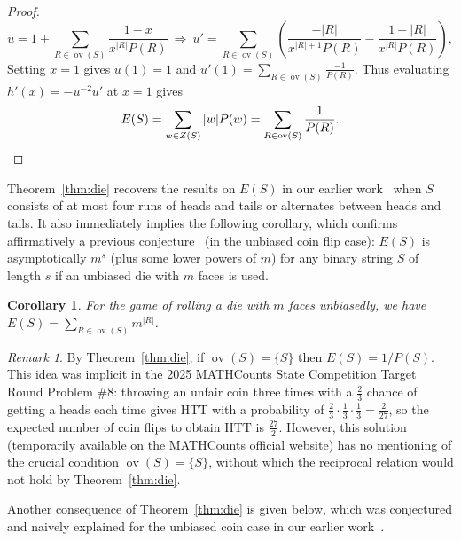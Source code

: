 \documentclass[10pt]{amsart}
\newtheorem{corollary}[theorem]{Corollary}
\theoremstyle{definition}
\theoremstyle{remark}
\newtheorem{remark}[theorem]{Remark}
\newcommand{\HH}{\mathrm{H}} \newcommand{\TT}{\mathrm{T}}
\DeclareMathOperator{\overlap}{ov}
\begin{document}
\begin{proof}
\[ u = 1 + \sum_{R\in\overlap(S)} \frac{1-x}{x^{|R|} P(R)} \ \Longrightarrow \ 
u' = \sum_{R\in\overlap(S)} \left( \frac{-|R|}{x^{|R|+1} P(R)} - \frac{1-|R|}{x^{|R|} P(R)} \right),
\]
Setting $x=1$ gives $u(1) = 1$ and $u'(1) = \sum_{R\in\overlap(S)}\frac{-1}{P(R)}$.
Thus evaluating $h'(x) = -u^{-2} u'$ at $x=1$ gives
\[ 
E(S) = \sum_{w\in Z(S)} |w| P(w) = \sum_{R\in\overlap(S)} \frac1{P(R)}. \qedhere
\]
\end{proof}

Theorem~\ref{thm:die} recovers the results on $E(S)$ in our earlier work~\cite{Huang} when $S$ consists of at most four runs of heads and tails or alternates between heads and tails.
It also immediately implies the following corollary, which confirms affirmatively a previous conjecture~\cite{Huang} (in the unbiased coin flip case): $E(S)$ is asymptotically $m^s$ (plus some lower powers of $m$) for any binary string $S$ of length $s$ if an unbiased die with $m$ faces is used.

\begin{corollary}
For the game of rolling a die with $m$ faces unbiasedly, we have $E(S) = \sum_{R\in\overlap(S)} m^{|R|}$.
\end{corollary}

\begin{remark}
By Theorem~\ref{thm:die}, if $\overlap(S) = \{S\}$ then $E(S) = 1/ P(S)$.
This idea was implicit in the 2025 MATHCounts State Competition Target Round Problem \#8: throwing an unfair coin three times with a $\frac23$ chance of getting a heads each time gives $\HH\TT\TT$ with a probability of $\frac23\cdot\frac13\cdot\frac13=\frac2{27}$, so the expected number of coin flips to obtain $\HH\TT\TT$ is $\frac{27}{2}$.
However, this solution (temporarily available on the MATHCounts official website) %
has no mentioning of the crucial condition $\overlap(S)=\{S\}$, without which the reciprocal relation would not hold by Theorem~\ref{thm:die}.
\end{remark}



Another consequence of Theorem~\ref{thm:die} is given below, which was conjectured and naively explained for the unbiased coin case in our earlier work~\cite{Huang}.
\end{document}
